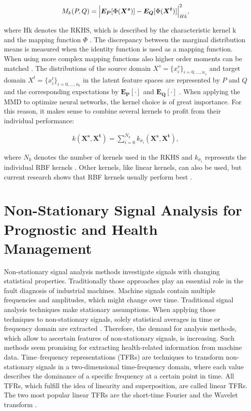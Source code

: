 \begin{align}
    M_{k}(P,Q) = \Bigl|  \boldsymbol{E_{P}}[\Phi(\boldsymbol{X^{s}})] - \boldsymbol{E_{Q}}[\Phi(\boldsymbol{X^{t}})]     \Bigl|^{2}_{Hk},
\end{align}

where Hk denotes the RKHS, which is described by the characteristic kernel k and the mapping function $\Phi$ \cite{AZAMFAR2020103932}. The discrepancy between the marginal distribution means is measured when the identity function is used as a mapping function. When using more complex mapping functions also higher order moments can be matched \cite{Yujia2015}. The distributions of the source domain $X^{s} = \{{x}_{i}^{s}\}_{i=0,...,n_{s}}$ and target domain $X^{t} = \{{x}_{i}^{t}\}_{i=0,...,n_{t}}$ in the latent feature spaces are represented by $P$ and $Q$ and the corresponding expectations by $\boldsymbol{E_{P}[\cdot]}$ and $\boldsymbol{E_{Q}[\cdot]}$ \cite{AZAMFAR2020103932}. When applying the MMD to optimize neural networks, the kernel choice is of great importance. For this reason, it makes sense to combine several kernels to profit from their individual performance:

\begin{align}
    k(\boldsymbol{X^{s}}, \boldsymbol{X^{t}}) = \sum_{i=0}^{N_{k}} k_{\sigma_{i}}(\boldsymbol{X^{s}}, \boldsymbol{X^{t}}),
\end{align}

where $N_{k}$ denotes the number of kernels used in the RKHS and $k_{\sigma_{i}}$ represents the individual RBF kernels \cite{li2020}. Other kernels, like linear kernels, can also be used, but current research shows that RBF kernels usually perform best \cite{AZAMFAR2020103932}.


\section{Non-Stationary Signal Analysis for Prognostic and Health Management}
Non-stationary signal analysis methods investigate signals with changing statistical properties. Traditionally those approaches play an essential role in the fault diagnosis of industrial machines. Machine signals contain multiple frequencies and amplitudes, which might change over time. Traditional signal analysis techniques make stationary assumptions. When applying those techniques to non-stationary signals, solely statistical averages in time or frequency domain are extracted \cite{FENG2013}. Therefore, the demand for analysis methods, which allow to ascertain features of non-stationary signals, is increasing. Such methods seem promising for extracting health-related information from machine data. Time–frequency representations (TFRs) are techniques to transform non-stationary signals in a two-dimensional time-frequency domain, where each value describes the dominance of a specific frequency at a certain point in time. All TFRs, which fulfill the idea of linearity and superposition, are called linear TFRs. The two most popular linear TFRs are the short-time Fourier and the Wavelet transform \cite{Hlawatsch1992}. 


